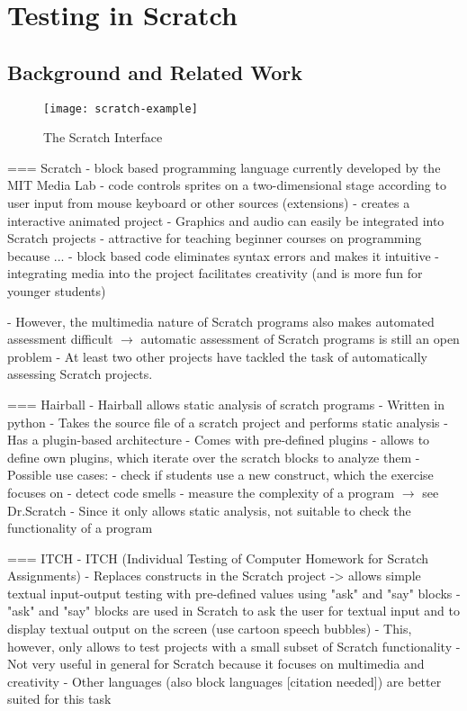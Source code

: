 \chapter{Testing in Scratch}

\section{Background and Related Work}

\begin{wrapfigure}{r}{0.5\textwidth}
    \centering
    \texttt{[image: scratch-example]}
    \caption{The Scratch Interface}
    \label{fig:the_scratch_interface}
\end{wrapfigure}
=== Scratch
- block based programming language currently developed by the MIT Media Lab \cite{scratch, scratchproject}
- code controls sprites on a two-dimensional stage according to user input from mouse keyboard or other sources (extensions)
- creates a interactive animated project
- Graphics and audio can easily be integrated into Scratch projects
- attractive for teaching beginner courses on programming because ...
    - block based code eliminates syntax errors and makes it intuitive
    - integrating media into the project facilitates creativity (and is more fun for younger students)

- However, the multimedia nature of Scratch programs also makes automated assessment difficult
$\rightarrow$ automatic assessment of Scratch programs is still an open problem
- At least two other projects have tackled the task of automatically assessing Scratch projects.

=== Hairball
- Hairball \cite{hairball} allows static analysis of scratch programs
- Written in python
- Takes the source file of a scratch project and performs static analysis
- Has a plugin-based architecture
    - Comes with pre-defined plugins
    - allows to define own plugins, which iterate over the scratch blocks to analyze them
- Possible use cases:
    - check if students use a new construct, which the exercise focuses on
    - detect code smells
    - measure the complexity of a program $\rightarrow$ see Dr.Scratch
- Since it only allows static analysis, not suitable to check the functionality of a program

=== ITCH
- ITCH (Individual Testing of Computer Homework for Scratch Assignments) \cite{itch}
- Replaces constructs in the Scratch project
    -> allows simple textual input-output testing with pre-defined values using "ask" and "say" blocks
    - "ask" and "say" blocks are used in Scratch to ask the user for textual input and to display textual output on the screen
      (use cartoon speech bubbles)
- This, however,  only allows to test projects with a small subset of Scratch functionality
- Not very useful in general for Scratch because it focuses on multimedia and creativity
- Other languages (also block languages [citation needed]) are better suited for this task

